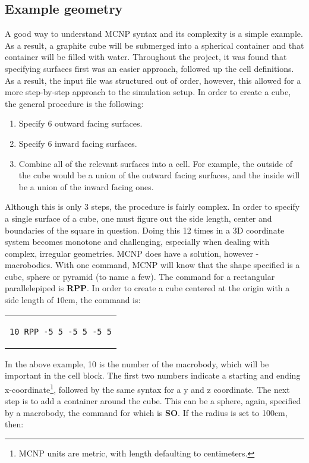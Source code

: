 \subsection{Example geometry}
A good way to understand MCNP syntax and its complexity is a simple example. As a result, a graphite cube will be submerged into a spherical container and that container will be filled with water. Throughout the project, it was found that specifying surfaces first was an easier approach, followed up the cell definitions. As a result, the input file was structured out of order, however, this allowed for a more step-by-step approach to the simulation setup. In order to create a cube, the general procedure is the following:
\begin{enumerate}
	\item Specify 6 outward facing surfaces.
	\item Specify 6 inward facing surfaces.
	\item Combine all of the relevant surfaces into a cell. For example, the outside of the cube would be a union of the outward facing surfaces, and the inside will be a union of the inward facing ones.
\end{enumerate}
Although this is only 3 steps, the procedure is fairly complex. In order to specify a single surface of a cube, one must figure out the side length, center and boundaries of the square in question. Doing this 12 times in a 3D coordinate system becomes monotone and challenging, especially when dealing with complex, irregular geometries. MCNP does have a solution, however - macrobodies. With one command, MCNP will know that the shape specified is a cube, sphere or pyramid (to name a few). The command for a rectangular parallelepiped is \textbf{RPP}. In order to create a cube centered at the origin with a side length of $10$cm, the command is:
\begin{center}
\begin{tabular}{c}
\begin{lstlisting}
10 RPP -5 5 -5 5 -5 5
\end{lstlisting}
\end{tabular}
\end{center}
In the above example, 10 is the number of the macrobody, which will be important in the cell block. The first two numbers indicate a starting and ending x-coordinate\footnote{MCNP units are metric, with length defaulting to centimeters.}, followed by the same syntax for a y and z coordinate. The next step is to add a container around the cube. This can be a sphere, again, specified by a macrobody, the command for which is \textbf{SO}. If the radius is set to 100cm, then:
